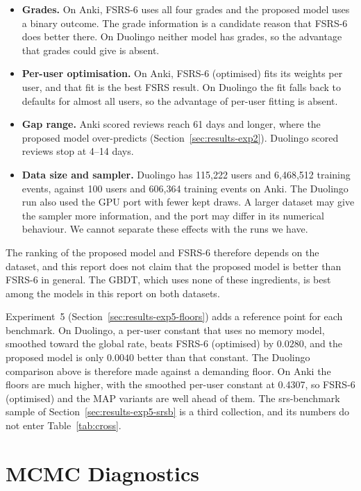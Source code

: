 \begin{itemize}
  \item \textbf{Grades.} On Anki, FSRS-6 uses all four grades and the proposed model uses a binary outcome. The grade
    information is a candidate reason that FSRS-6 does better there. On Duolingo neither model has grades, so the
    advantage that grades could give is absent.
  \item \textbf{Per-user optimisation.} On Anki, FSRS-6 (optimised) fits its weights per user, and that fit is the
    best FSRS result. On Duolingo the fit falls back to defaults for almost all users, so the advantage of per-user
    fitting is absent.
  \item \textbf{Gap range.} Anki scored reviews reach 61 days and longer, where the proposed model over-predicts
    (Section~\ref{sec:results-exp2}). Duolingo scored reviews stop at 4--14 days.
  \item \textbf{Data size and sampler.} Duolingo has 115,222 users and 6,468,512 training events, against 100
    users and 606,364 training events on Anki. The Duolingo run also used the GPU port with fewer kept draws. A larger
    dataset may give the sampler more information, and the port may differ in its numerical behaviour. We cannot separate
    these effects with the runs we have.
\end{itemize}

The ranking of the proposed model and FSRS-6 therefore depends on the dataset, and this report does not claim that the proposed model is better than FSRS-6 in general. The GBDT, which uses none of these ingredients, is best among the models in this report on both datasets.

Experiment~5 (Section~\ref{sec:results-exp5-floors}) adds a reference point for each benchmark. On Duolingo, a per-user constant
that uses no memory model, smoothed toward the global rate, beats FSRS-6 (optimised) by $0.0280$, and the proposed model is only
$0.0040$ better than that constant. The Duolingo comparison above is therefore made against a demanding floor. On Anki the floors are
much higher, with the smoothed per-user constant at 0.4307, so FSRS-6 (optimised) and the MAP variants are well ahead of them. The
srs-benchmark sample of Section~\ref{sec:results-exp5-srsb} is a third collection, and its numbers do not enter Table~\ref{tab:cross}.

\section{MCMC Diagnostics}
\label{sec:results-mcmc}

